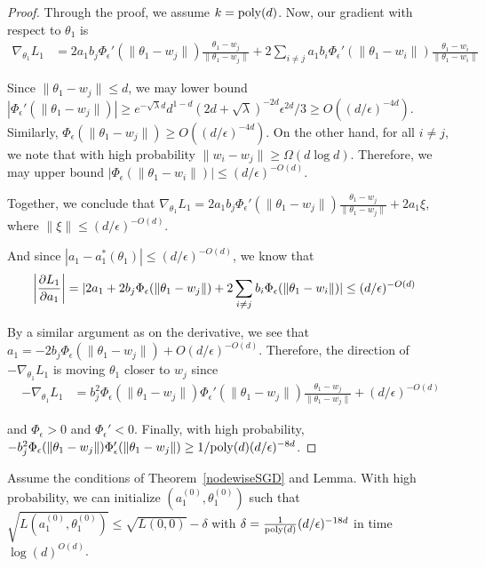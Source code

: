 \begin{proof}
Through the proof, we assume $k = \mathrm{poly}(d)$. Now, our gradient with respect to $\theta_1$ is
%
\begin{align*}
\nabla_{\theta_1} L_1 &= 2a_1b_j \Phi_\epsilon'(\|\theta_1 - w_j\|) \frac{\theta_1 - w_j}{\|\theta_1 - w_j\|}+ 2\sum_{i\neq j} a_1b_i\Phi_\epsilon'(\|\theta_1 - w_i\|) \frac{\theta_1 - w_i}{\|\theta_1 - w_i\|}
\end{align*}
%

Since $\|\theta_1 - w_j\| \leq d$, we may lower bound $|\Phi_\epsilon'(\|\theta_1 - w_j\|)| \geq e^{-\sqrt{\lambda}d}d^{1-d}(2d+\sqrt{\lambda})^{-2d}\epsilon^{2d}/3 \geq O((d/\epsilon)^{-4d})$. Similarly, $\Phi_\epsilon(\|\theta_1 - w_j\|) \geq O((d/\epsilon)^{-4d})$. On the other hand, for all $i \neq j$, we note that with high probability $\|w_i - w_j\| \geq \Omega(d \log d)$. Therefore, we may upper bound $|\Phi_{\epsilon}(\|\theta_1 - w_i\|)| \leq (d/\epsilon)^{-O(d)}$. 

Together, we conclude that $\nabla_{\theta_1} L_1 = 2a_1b_j \Phi_\epsilon'(\|\theta_1 - w_j\|) \frac{\theta_1 - w_j}{\|\theta_1 - w_j\|} + 2a_1\xi$, where $\|\xi\| \leq (d/\epsilon)^{-O(d)}$.

And since $|a_1 - a_1^*(\theta_1)| \leq (d/\epsilon)^{-O(d)}$, we know that
%
\begin{align*}
   \left| \frac{\partial L_1}{\partial a_1} \right| & = \lvert 2a_1 + 2b_j \Phi_\epsilon(\|\theta_1 - w_j\|) + 2\sum_{i \neq j} b_i \Phi_\epsilon(\|\theta_1 - w_i\|) \rvert \leq (d/\epsilon)^{-O(d)}
\end{align*}

By a similar argument as on the derivative, we see that $a_1 = -2b_j \Phi_\epsilon(\|\theta_1 - w_j\|) + O(d/\epsilon)^{-O(d)}$. Therefore, the direction of $-\nabla_{\theta_1} L_1$ is moving $\theta_1$ closer to $w_j$ since 
%
\begin{align*}
-\nabla_{\theta_1} L_1 &=  b_j^2\Phi_\epsilon(\|\theta_1-w_j\|)\Phi_\epsilon'(\|\theta_1 - w_j\|) \frac{\theta_1 - w_j}{\|\theta_1 - w_j\|} + (d/\epsilon)^{-O(d)} 
\end{align*}

and $\Phi_\epsilon > 0$ and $\Phi_\epsilon' < 0$. Finally, with high probability, $-b_j^2\Phi_\epsilon(\|\theta_1-w_j\|)\Phi_\epsilon'(\|\theta_1 - w_j\|) \geq 1/\mathrm{poly}(d)(d/\epsilon)^{-8d}$.
\end{proof}

 
 \begin{lemma}[Initialization]\label{nodeInitialize}
Assume the conditions of Theorem~\ref{nodewiseSGD} and Lemma. With high probability, we can initialize $(a_1^{(0)},\theta_1^{(0)})$ such that $\sqrt{L(a_1^{(0)},\theta_1^{(0)})} \leq \sqrt{L({0,0})} -\delta$ with $\delta = \frac{1}{\mathrm{poly}(d)}(d/\epsilon)^{ -18d}$ in time $\log(d)^{O(d)}$.
 \end{lemma}


